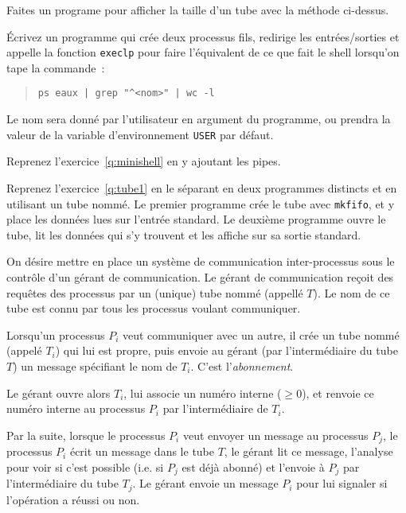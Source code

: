 Faites un programe pour afficher la taille d'un tube avec la méthode
ci-dessus.


\question

Écrivez un programme qui crée deux processus fils, redirige les
entrées/sorties et appelle la fonction \texttt{execlp} pour faire
l'équivalent de ce que fait le shell lorsqu'on tape la commande~:

\begin {quote}
    \texttt {ps eaux | grep "\^{ }<nom>" | wc -l}
\end {quote}

Le nom sera donné par l'utilisateur en argument du programme, ou
prendra la valeur de la variable d'environnement {\tt USER} par défaut.

\question

Reprenez l'exercice~\ref {q:minishell} en y ajoutant les pipes.

\question

Reprenez l'exercice~\ref {q:tube1} en le séparant en deux
programmes distincts et en utilisant un tube nommé.  Le premier
programme crée le tube avec {\tt mkfifo}, et y place les données lues
sur l'entrée standard.  Le deuxième programme ouvre le tube, lit les
données qui s'y trouvent et les affiche sur sa sortie standard.


\question

On désire mettre en place un système de communication inter-processus
sous le contrôle d'un gérant de communication.  Le gérant de
communication reçoit des requêtes des processus par un (unique) tube
nommé (appellé $T$). Le nom de ce tube est connu par tous les processus
voulant communiquer.

Lorsqu'un processus $P_i$ veut communiquer avec un autre, il crée un
tube nommé (appelé $T_i$) qui lui est propre, puis envoie au gérant (par
l'intermédiaire du tube $T$) un message spécifiant le nom de $T_i$.
C'est l'{\em abonnement}.

Le gérant ouvre alors $T_i$, lui associe un numéro interne ($\geq 0$),
et renvoie ce numéro interne au processus $P_i$ par l'intermédiaire de
$T_i$.

Par la suite, lorsque le processus $P_i$ veut envoyer un message au
processus $P_j$, le processus $P_i$ écrit un message dans le tube $T$,
le gérant lit ce message, l'analyse pour voir si c'est possible (i.e.
si $P_j$ est déjà abonné) et l'envoie à $P_j$ par l'intermédiaire du
tube $T_j$. Le gérant envoie un message $P_i$ pour lui signaler si
l'opération a réussi ou non.

